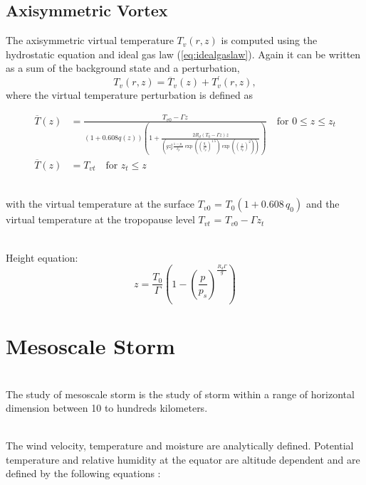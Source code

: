 \documentclass[times,doublespace]{fldauth}
\begin{document}
\subsection{Axisymmetric Vortex}

The axisymmetric virtual temperature $T_v(r,z)$ is computed using the hydrostatic equation and ideal gas law (\ref{eq:idealgaslaw}).  Again it can be written as a sum of the background state and a perturbation,
\begin{equation} \label{eq:virt_temp}
T_v(r,z) = \overline{T}_v(z) + T_v^\prime(r,z),
\end{equation} where the virtual temperature perturbation is defined as

\begin{equation}
\begin{split}
\overline{T}(z)&=\frac{T_{v0}-\Gamma z}{(1+0.608q(z))\left(1+\frac{2R_d(T_0-\Gamma z)z}{\left( g z_p^2\frac{1-p_s}{\delta_p}\exp\left(\left(\frac{g_r}{r_p}\right)^{1.5}\right)\exp\left(\left(\frac{z}{z_p}\right)^2\right) \right)}   \right)} \text{ ~~for   } 0 \leq z \leq z_t \\
\overline{T}(z)&=T_{vt}  \text{ ~~for   }  z_t \leq z
\end{split}
\end{equation}

~\\with the virtual temperature at the surface $T_{v0}$ = $T_0 (1+0.608 \, q_0)$ and the virtual temperature at the tropopause level $T_{vt}$ = $T_{v0} - \Gamma z_t$

~\\Height equation:
\begin{equation}
z=\frac{T_0}{\Gamma}\left(1-\left(\frac{p}{p_s}\right) ^{\frac{R_d\Gamma}{g}}\right)
\end{equation}

\clearpage

\section{Mesoscale Storm}  \label{sec:3}

~\\ The study of mesoscale storm is the study of storm within a range of horizontal dimension  between 10 to hundreds kilometers. 

~\\The wind velocity, temperature and moisture are analytically defined. Potential temperature and relative humidity at the equator are altitude dependent and are defined by the following equations :
\end{document}

